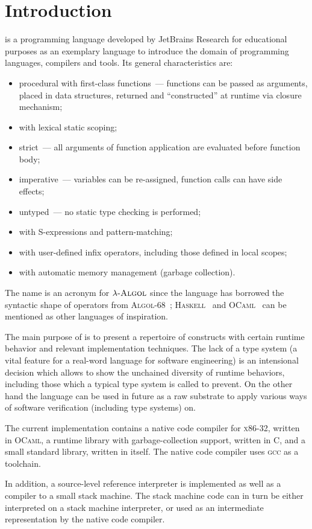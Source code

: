 \chapter{Introduction}

\lama is a programming language developed by JetBrains Research for educational purposes as an exemplary language to introduce
the domain of programming languages, compilers and tools. Its general characteristics are:

\begin{itemize}
\item procedural with first-class functions~--- functions can be passed as arguments, placed in data structures,
  returned and ``constructed'' at runtime via closure mechanism;
\item with lexical static scoping;
\item strict~--- all arguments of function application are evaluated before function body;
\item imperative~--- variables can be re-assigned, function calls can have side effects;
\item untyped~--- no static type checking is performed;
\item with S-expressions and pattern-matching;
\item with user-defined infix operators, including those defined in local scopes;
\item with automatic memory management (garbage collection).
\end{itemize}

The name \lama is an acronym for $\lambda\textsc{-Algol}$ since the language has borrowed the syntactic shape of
operators from \textsc{Algol-68}~\cite{A68}; \textsc{Haskell}~\cite{haskell} and \textsc{OCaml}~\cite{ocaml} can be
mentioned as other languages of inspiration.

The main purpose of \lama is to present a repertoire of constructs with certain runtime behavior and
relevant implementation techniques. The lack of a type system (a vital feature for a real-word language
for software engineering) is an intensional decision which allows to show the unchained diversity
of runtime behaviors, including those which a typical type system is called to prevent. On the other hand
the language can be used in future as a raw substrate to apply various ways of software verification (including
type systems) on.

The current implementation contains a native code compiler for \textsc{x86-32}, written
in \textsc{OCaml}, a runtime library with garbage-collection support, written in \textsc{C}, and a small
standard library, written in \lama itself. The native code compiler uses \textsc{gcc} as a toolchain.

In addition, a source-level reference interpreter is implemented as well as a compiler to a small
stack machine. The stack machine code can in turn be either interpreted on a stack machine interpreter, or
used as an intermediate representation by the native code compiler.
